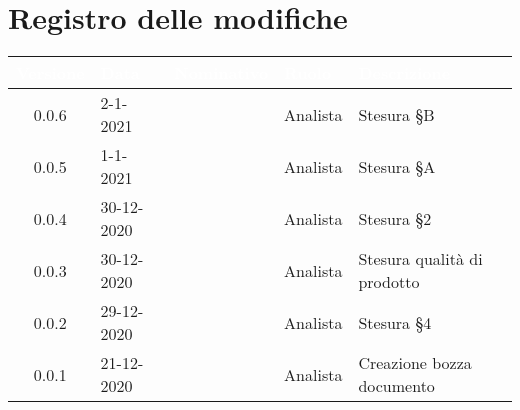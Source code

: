 \section*{Registro delle modifiche}
\setcounter{table}{-1}
{
\renewcommand{\arraystretch}{1.5}
\centering
\begin{longtable}{c C{2.6cm} C{3cm} C{2.6cm} C{5cm}}
\textcolor{white}{\textbf{Versione}}&
\textcolor{white}{\textbf{Data}}&
\textcolor{white}{\textbf{Nominativo}}&
\textcolor{white}{\textbf{Ruolo}}&
\textcolor{white}{\textbf{Descrizione}}\\	
\endhead

0.0.6 & 2-1-2021 & \RA{} & Analista & Stesura \S B \\
0.0.5 & 1-1-2021 & \PA{} & Analista & Stesura \S A \\
0.0.4 & 30-12-2020 & \PA{} & Analista & Stesura \S 2 \\
0.0.3 & 30-12-2020 & \ZM{} & Analista & Stesura qualità di prodotto\\
0.0.2 & 29-12-2020 & \RA{} & Analista & Stesura \S 4 \\
0.0.1 & 21-12-2020 & \ZM{} & Analista & Creazione bozza documento \\	
\end{longtable}
}
